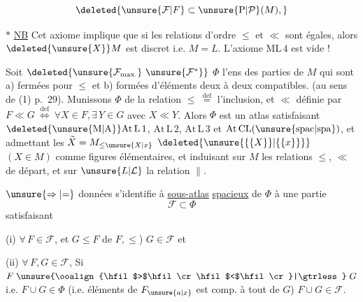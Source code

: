 \[
\deleted{\unsure{\mathcal F|F}\subset\unsure{\mathrm P|\mathcal P}(M),}
\]


$*$ \uline{NB} Cet axiome implique que si les relations d'ordre $\leq$ et $\ll$ sont égales, alors $\deleted{\unsure{X}}M$ est discret i.e. $M=L$.  L'axiome $\mathrm{ML\,4}$ est vide !

Soit $\deleted{\unsure{\mathcal F_{\mathrm{max.}}}\ \unsure{\mathcal F^{*}}}$ $\Phi$ l'ens des parties de $M$ qui sont a) fermées pour $\leq$ et b) formées d'éléments deux à deux compatibles. (au sens de (1) p.~29). Munissons $\Phi$ de la relation $\leq\ \overset{\mathrm{def}}{=}$ l'inclusion, et $\ll$ définie par $F\ll G\ \overset{\mathrm{def}}{\Longleftrightarrow}\ \forall X\in F,\exists\,Y\in G$ avec $X\ll Y$. Alors $\Phi$ est un atlas  satisfaisant $\mathrm{\deleted{\unsure{M|A}}At\,L\,1}$, $\mathrm{At\,L\,2}$, $\mathrm{At\,L\,3}$ et $\mathrm{At\,CL(\unsure{\mathrm{spac}|\mathrm{spa}})}$, et admettant les $\widetilde X=M_{\leq\unsure{X|x}}$ $\deleted{\unsure{\{\{X\}\}|\{\{x\}\}}}$ $(X\in M)$ comme  figures élémentaires,  et  induisant sur $M$ les relations $\leq$, $\ll$ de départ, et sur $\unsure{L|\mathcal L}$  la relation $\parallel$.

  $\unsure{\Rightarrow|\mathord{=}}$ données s'identifie à  \uline{sous-atlas} \uline{spacieux} de $\Phi$   à une partie
\[
 \mathcal F\subset\Phi
\]
satisfaisant

(i) $\forall\,F\in\mathcal F$, et $G\leq F$   de $F,\leq$)  $G\in\mathcal F$ et

(ii) $\forall\,F,G\in\mathcal F$, Si $F\mathrel{\unsure{\ooalign{\hfil$>$\hfil\cr\hfil$<$\hfil\cr}|\gtrless}}G$ i.e. $F\cup G\in\Phi$ (i.e.  éléments de $F_{\unsure{a|x}}$ est comp. à tout  de $G$) $F\cup G\in\mathcal F$.


